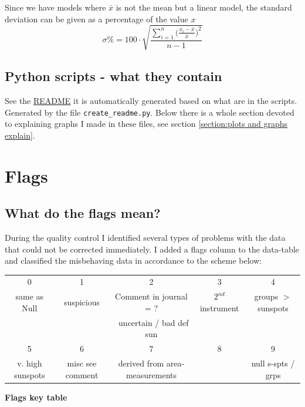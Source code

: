 \documentclass[12pt]{article}
\begin{document}
Since we have models where $\bar{x}$ is not the mean but a linear model, the standard deviation can be given as a percentage of the value $x$
\begin{equation}\label{equation:standard deviation percentage}
    \sigma\% = 100\cdot \sqrt{\frac{\sum_{i=1}^{n}\big(\frac{x_i-\bar{x}}{\bar{x}}\big)^2}{n-1}}
\end{equation}


\subsection{Python scripts - what they contain}
See the \href{https://github.com/dcxSt/DATA_SILSO_HISTO_search}{README} it is automatically generated based on what are in the scripts. Generated by the file \texttt{create\_readme.py}. Below there is a whole section devoted to explaining graphs I made in these files, see section \ref{section:plots and graphs explain}.

\section{Flags}
\subsection{What do the flags mean?}\label{flags section}
During the quality control I identified several types of problems with the data that could not be corrected immediately. I added a flags column to the data-table and classified the misbehaving data in accordance to the scheme below:\\

{\centering
    \begin{tabular}{c|c|c|c|c}\label{table:flags key}
        0 & 1 & 2 & 3 & 4 \\
        same as Null & suspicious & Comment in journal = ? & $2^{nd}$ instrument & groups $>$ sunspots\\
        && $~$ uncertain / bad def sun && \\
        \hline
        5 & 6 & 7 & 8 & 9\\
        v. high sunspots & misc see comment & derived from area-measurements &  & null s-spts / grps
         
    \end{tabular}
    \caption{\textbf{Flags key table}}
    \label{tab:flag}
\par}\\
\end{document}
